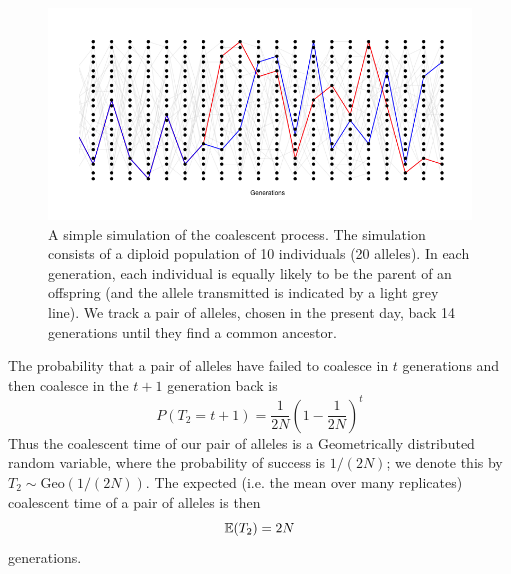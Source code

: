 \begin{figure}
\begin{center}
\includegraphics[width=\textwidth]{figures/Coalescent.png}
\end{center}
\caption{A simple simulation of the coalescent process. The simulation
  consists of a diploid population of 10 individuals (20 alleles). In
  each generation, each individual is equally likely to be the parent
  of an offspring (and the allele transmitted is indicated by a light
  grey line).  We track a
  pair of alleles, chosen in the present day, back 14 generations
  until they find a common ancestor.  } \label{fig:Coalescent_simulation}  %
\end{figure}

The probability that a pair of alleles
have failed to coalesce in $t$ generations and then coalesce in the
$t+1$ generation back is 
\begin{equation}
 P(T_2=t+1) = \frac{1}{2N} \left(1- \frac{1}{2N} \right)^{t} \label{eqn:coal_time_dist}
\end{equation}
Thus the coalescent time of our pair of alleles is a Geometrically distributed random variable, where the probability of success is $1/(2N)$; we denote this by $T_2 \sim  \text{Geo}(1/(2N))$.
The expected (i.e. the mean over many replicates) coalescent time of a pair of alleles is then  
\begin{equation}
\mathbb{E}(T_2) = 2N 
\end{equation}
generations.\\


